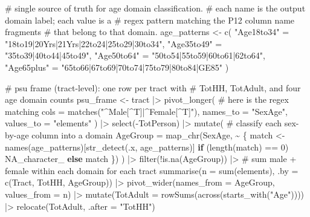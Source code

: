 \documentclass[
  11pt,
]{article}
\newenvironment{Shaded}{\begin{snugshade}}{\end{snugshade}}
\newcommand{\AttributeTok}[1]{\textcolor[rgb]{0.40,0.45,0.13}{#1}}
\newcommand{\CommentTok}[1]{\textcolor[rgb]{0.37,0.37,0.37}{#1}}
\newcommand{\ConstantTok}[1]{\textcolor[rgb]{0.56,0.35,0.01}{#1}}
\newcommand{\ControlFlowTok}[1]{\textcolor[rgb]{0.00,0.23,0.31}{\textbf{#1}}}
\newcommand{\DecValTok}[1]{\textcolor[rgb]{0.68,0.00,0.00}{#1}}
\newcommand{\FunctionTok}[1]{\textcolor[rgb]{0.28,0.35,0.67}{#1}}
\newcommand{\NormalTok}[1]{\textcolor[rgb]{0.00,0.23,0.31}{#1}}
\newcommand{\OtherTok}[1]{\textcolor[rgb]{0.00,0.23,0.31}{#1}}
\newcommand{\SpecialCharTok}[1]{\textcolor[rgb]{0.37,0.37,0.37}{#1}}
\newcommand{\StringTok}[1]{\textcolor[rgb]{0.13,0.47,0.30}{#1}}
\begin{document}
\begin{Shaded}
\begin{Highlighting}[]
\CommentTok{\# single source of truth for age domain classification.}
\CommentTok{\# each name is the output domain label; each value is a}
\CommentTok{\# regex pattern matching the P12 column name fragments}
\CommentTok{\# that belong to that domain.}
\NormalTok{age\_patterns }\OtherTok{\textless{}{-}} \FunctionTok{c}\NormalTok{(}
  \StringTok{"Age18to34"} \OtherTok{=} \StringTok{"18to19|20Yrs|21Yrs|22to24|25to29|30to34"}\NormalTok{,}
  \StringTok{"Age35to49"} \OtherTok{=} \StringTok{"35to39|40to44|45to49"}\NormalTok{,}
  \StringTok{"Age50to64"} \OtherTok{=} \StringTok{"50to54|55to59|60to61|62to64"}\NormalTok{,}
  \StringTok{"Age65plus"} \OtherTok{=} \StringTok{"65to66|67to69|70to74|75to79|80to84|GE85"}
\NormalTok{)}

\CommentTok{\# psu frame (tract{-}level): one row per tract with}
\CommentTok{\# TotHH, TotAdult, and four age domain counts}
\NormalTok{psu\_frame }\OtherTok{\textless{}{-}}\NormalTok{ tract }\SpecialCharTok{|\textgreater{}}
  \FunctionTok{pivot\_longer}\NormalTok{(}
    \CommentTok{\# here is the regex matching}
    \AttributeTok{cols =} \FunctionTok{matches}\NormalTok{(}\StringTok{"\^{}Male[\^{}T]|\^{}Female[\^{}T]"}\NormalTok{),}
    \AttributeTok{names\_to =} \StringTok{"SexAge"}\NormalTok{, }\AttributeTok{values\_to =} \StringTok{"elements"}
\NormalTok{  ) }\SpecialCharTok{|\textgreater{}}
  \FunctionTok{select}\NormalTok{(}\SpecialCharTok{{-}}\NormalTok{TotPerson) }\SpecialCharTok{|\textgreater{}}
  \FunctionTok{mutate}\NormalTok{(}
    \CommentTok{\# classify each sex{-}by{-}age column into a domain}
    \AttributeTok{AgeGroup =} \FunctionTok{map\_chr}\NormalTok{(SexAge, }\SpecialCharTok{\textasciitilde{}}\NormalTok{ \{}
\NormalTok{      match }\OtherTok{\textless{}{-}} \FunctionTok{names}\NormalTok{(age\_patterns)[}\FunctionTok{str\_detect}\NormalTok{(.x, age\_patterns)]}
      \ControlFlowTok{if}\NormalTok{ (}\FunctionTok{length}\NormalTok{(match) }\SpecialCharTok{==} \DecValTok{0}\NormalTok{) }\ConstantTok{NA\_character\_} \ControlFlowTok{else}\NormalTok{ match}
\NormalTok{    \})}
\NormalTok{  ) }\SpecialCharTok{|\textgreater{}}
  \FunctionTok{filter}\NormalTok{(}\SpecialCharTok{!}\FunctionTok{is.na}\NormalTok{(AgeGroup)) }\SpecialCharTok{|\textgreater{}}
  \CommentTok{\# sum male + female within each domain for each tract}
  \FunctionTok{summarise}\NormalTok{(}\AttributeTok{n =} \FunctionTok{sum}\NormalTok{(elements), }\AttributeTok{.by =} \FunctionTok{c}\NormalTok{(Tract, TotHH, AgeGroup)) }\SpecialCharTok{|\textgreater{}}
  \FunctionTok{pivot\_wider}\NormalTok{(}\AttributeTok{names\_from =}\NormalTok{ AgeGroup, }\AttributeTok{values\_from =}\NormalTok{ n) }\SpecialCharTok{|\textgreater{}}
  \FunctionTok{mutate}\NormalTok{(}\AttributeTok{TotAdult =} \FunctionTok{rowSums}\NormalTok{(}\FunctionTok{across}\NormalTok{(}\FunctionTok{starts\_with}\NormalTok{(}\StringTok{"Age"}\NormalTok{)))) }\SpecialCharTok{|\textgreater{}}
  \FunctionTok{relocate}\NormalTok{(TotAdult, }\AttributeTok{.after =} \StringTok{"TotHH"}\NormalTok{)}


\end{Highlighting}
\end{Shaded}
\end{document}
